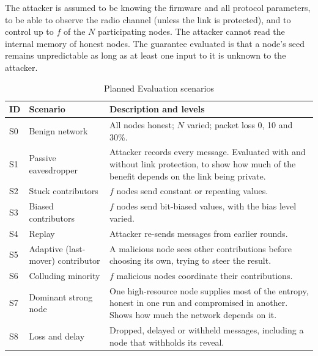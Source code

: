 \documentclass[a4paper, 12pt]{article}
\begin{document}
The attacker is assumed to be knowing the firmware and all protocol parameters, to be able to observe the radio channel (unless the link is protected), and to control up to $f$ of the $N$ participating nodes. The attacker cannot read the internal memory of honest nodes. The guarantee evaluated is that a node's seed remains unpredictable as long as at least one input to it is unknown to the attacker.
 
\begin{table}[htbp]
\centering
\small
\caption{Planned Evaluation scenarios}
\label{tab:ev_scenarios}
\begin{tabularx}{\textwidth}{@{}p{}p{}X@{}}
\toprule
\textbf{ID} & \textbf{Scenario} & \textbf{Description and levels} \\
\midrule
S0 & Benign network & All nodes honest; $N$ varied; packet loss 0, 10 and 30\%. \\
S1 & Passive eavesdropper & Attacker records every message. Evaluated with and without link protection, to show how much of the benefit depends on the link being private. \\
S2 & Stuck contributors & $f$ nodes send constant or repeating values. \\
S3 & Biased contributors & $f$ nodes send bit-biased values, with the bias level varied. \\
S4 & Replay & Attacker re-sends messages from earlier rounds. \\
S5 & Adaptive (last-mover) contributor & A malicious node sees other contributions before choosing its own, trying to steer the result. \\
S6 & Colluding minority & $f$ malicious nodes coordinate their contributions. \\
S7 & Dominant strong node & One high-resource node supplies most of the entropy, honest in one run and compromised in another. Shows how much the network depends on it. \\
S8 & Loss and delay & Dropped, delayed or withheld messages, including a node that withholds its reveal. \\
\bottomrule
\end{tabularx}
\end{table} 
 
\end{document}
